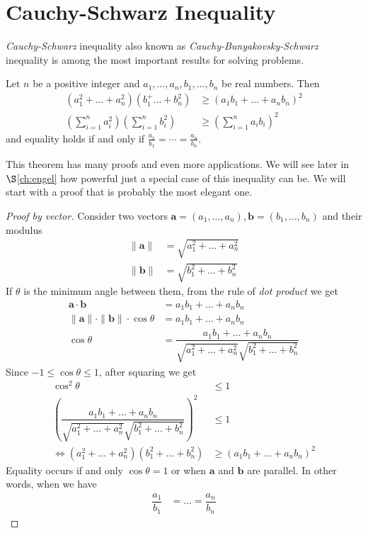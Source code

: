\documentclass{subfile}
\begin{document}
	\section{Cauchy-Schwarz Inequality}\label{sec:cs}
	\textit{Cauchy-Schwarz} inequality also known as \textit{Cauchy-Bunyakovsky-Schwarz} inequality is among the most important results for solving problems.
		\begin{theorem}
			Let $n$ be a positive integer and $a_1,\ldots,a_n,b_1,\ldots,b_n$ be real numbers. Then
				\begin{align*}
					(a_1^2+\ldots+a_n^2)(b_1^+\ldots+b_n^2)
						& \geq(a_1b_1+\ldots+a_nb_n)^2\\
					\left(\sum_{i=1}^na_i^2\right)\left(\sum_{i=1}^nb_i^2\right)
						& \geq\left(\sum_{i=1}^na_ib_i\right)^2
				\end{align*}
			and equality holds if and only if $\frac{a_1}{b_1}=\cdots=\frac{a_n}{b_n}$.
		\end{theorem}
	
	This theorem has many proofs and even more applications. We will see later in \hyperref[ch:engel]{$\S$\ref{ch:engel}} how powerful just a special case of this inequality can be. We will start with a proof that is probably the most elegant one.
	
		\begin{proof}[Proof by vector]
			Consider two vectors $\mathbf{a}=(a_1,\ldots,a_n),\mathbf{b}=(b_1,\ldots,b_n)$ and their modulus
				\begin{align*}
					\|\mathbf{a}\|
						& = \sqrt{a_1^2+\ldots+a_n^2}\\
					\|\mathbf{b}\|
						& = \sqrt{b_1^2+\ldots+b_n^2}
				\end{align*}
			If $\theta$ is the minimum angle between them, from the rule of \textit{dot product} we get
				\begin{align*}
					\mathbf{a}\cdot\mathbf{b}
						& = a_1b_1+\ldots+a_nb_n\\
					\|\mathbf{a}\|\cdot\|\mathbf{b}\|\cdot\cos\theta
						& = a_1b_1+\ldots+a_nb_n\\
					\cos{\theta}
						& = \dfrac{a_1b_1+\ldots+a_nb_n}{\sqrt{a_1^2+\ldots+a_n^2}\sqrt{b_1^2+\ldots+b_n^2}}
				\end{align*}
			Since $-1\leq\cos\theta\leq1$, after squaring we get
				\begin{align*}
					\cos^2\theta
						& \leq1\\
					\left(\dfrac{a_1b_1+\ldots+a_nb_n}{\sqrt{a_1^2+\ldots+a_n^2}\sqrt{b_1^2+\ldots+b_n^2}}\right)^2
						& \leq1\\
					\iff (a_1^2+\ldots+a_n^2)(b_1^2+\ldots+b_n^2)
						& \geq(a_1b_1+\ldots+a_nb_n)^2
				\end{align*}
			Equality occurs if and only $\cos\theta=1$ or when $\mathbf{a}$ and $\mathbf{b}$ are parallel. In other words, when we have
				\begin{align*}
					\dfrac{a_1}{b_1}& = \ldots=\dfrac{a_n}{b_n}
				\end{align*}
		\end{proof}
	
\end{document}
